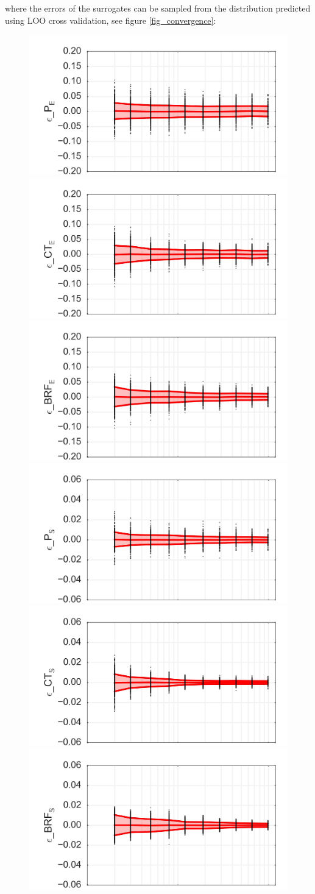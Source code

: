 \documentclass[preprint,12pt]{elsarticle}
\begin{document}
\noindent where the errors of the surrogates can be sampled from the distribution predicted using LOO cross validation, see figure \ref{fig_convergence}:


\begin{figure}[h!]
\begin{centering}
\includegraphics[width=0.32\columnwidth]{Figures/Convergence/CV_E_P.jpg}
\includegraphics[width=0.32\columnwidth]{Figures/Convergence/CV_E_CT.jpg}
\includegraphics[width=0.32\columnwidth]{Figures/Convergence/CV_E_BRFBM_EFL_M12.jpg} \\
\includegraphics[width=0.32\columnwidth]{Figures/Convergence/CV_V_P.jpg}
\includegraphics[width=0.32\columnwidth]{Figures/Convergence/CV_V_CT.jpg}
\includegraphics[width=0.32\columnwidth]{Figures/Convergence/CV_V_BRFBM_EFL_M12.jpg} \\

\end{centering}
\end{figure}
\end{document}
